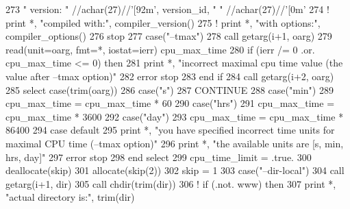 \begin{DoxyCode}
273                 \textcolor{stringliteral}{" version: "} //achar(27)//\textcolor{stringliteral}{'[92m'}, version_id, \textcolor{stringliteral}{" "} //achar(27)//\textcolor{stringliteral}{'[0m'}
274     \textcolor{comment}{!           print *, "compiled with:", compiler\_version()}
275     \textcolor{comment}{!           print *, "with options:", compiler\_options()}
276                     stop
277             \textcolor{keywordflow}{case}(\textcolor{stringliteral}{"--tmax"})
278                   \textcolor{keyword}{call }getarg(i+1, oarg)
279                   \textcolor{keyword}{read}(unit=oarg, fmt=*, iostat=ierr) cpu_max_time
280                   \textcolor{keywordflow}{if} (ierr /= 0 .or. cpu_max_time <= 0) \textcolor{keywordflow}{then}
281                    print *, \textcolor{stringliteral}{"incorrect maximal cpu time value (the value after --tmax option)"}
282                    error stop
283 \textcolor{keywordflow}{                  end if}
284                   \textcolor{keyword}{call }getarg(i+2, oarg)
285                   \textcolor{keywordflow}{select case}(trim(oarg))
286                     \textcolor{keywordflow}{case}(\textcolor{stringliteral}{"s"})
287                       \textcolor{keywordflow}{CONTINUE}
288                     \textcolor{keywordflow}{case}(\textcolor{stringliteral}{"min"})
289                       cpu_max_time = cpu_max_time * 60
290                     \textcolor{keywordflow}{case}(\textcolor{stringliteral}{"hrs"})
291                       cpu_max_time = cpu_max_time * 3600
292                     \textcolor{keywordflow}{case}(\textcolor{stringliteral}{"day"})
293                       cpu_max_time = cpu_max_time * 86400
294 \textcolor{keywordflow}{                    case default}
295                       print *, \textcolor{stringliteral}{"you have specified incorrect time units for maximal CPU time (--tmax
       option)"}
296                       print *, \textcolor{stringliteral}{"the available units are [s, min, hrs, day]"}
297                       error stop
298 \textcolor{keywordflow}{                  end select}
299                   cpu_time_limit = .true.
300                   \textcolor{keyword}{deallocate}(skip)
301                   \textcolor{keyword}{allocate}(skip(2))
302                   skip = 1
303             \textcolor{keywordflow}{case}(\textcolor{stringliteral}{"--dir-local"})
304                   \textcolor{keyword}{call }getarg(i+1, dir)
305                   \textcolor{keyword}{call }chdir(trim(dir))
306 \textcolor{comment}{!                 if (.not. www) then}
307                   print *, \textcolor{stringliteral}{"actual directory is:"}, trim(dir)

\end{DoxyCode}
